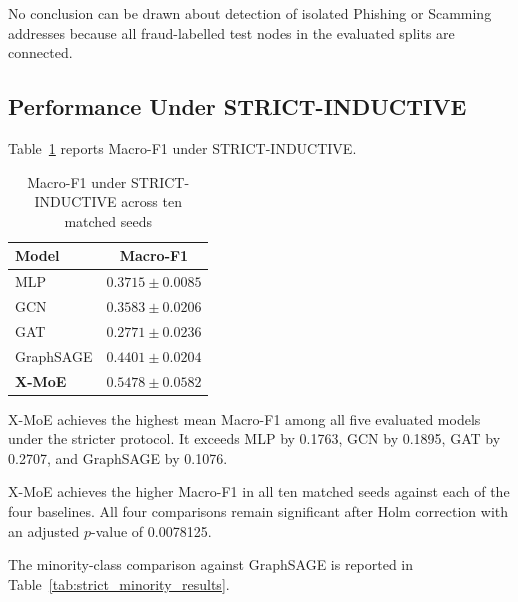 \documentclass{ieeeaccess}
\begin{document}
No conclusion can be drawn about detection of isolated Phishing or Scamming addresses because all fraud-labelled test nodes in the evaluated splits are connected.


\subsection{Performance Under STRICT-INDUCTIVE}

Table~\ref{tab:strict_overall_results} reports Macro-F1 under STRICT-INDUCTIVE.

\begin{table}[t]
\centering
\caption{Macro-F1 under STRICT-INDUCTIVE across ten matched seeds}
\label{tab:strict_overall_results}

\renewcommand{\arraystretch}{1.12}
\setlength{\tabcolsep}{5pt}
\scriptsize

\begin{tabular}{lc}
\toprule
\textbf{Model} &
\textbf{Macro-F1} \\
\midrule

MLP &
$0.3715 \pm 0.0085$ \\

GCN &
$0.3583 \pm 0.0206$ \\

GAT &
$0.2771 \pm 0.0236$ \\

GraphSAGE &
$0.4401 \pm 0.0204$ \\

\textbf{X-MoE} &
$\mathbf{0.5478 \pm 0.0582}$ \\

\bottomrule
\end{tabular}
\end{table}

X-MoE achieves the highest mean Macro-F1 among all five evaluated models under the stricter protocol. It exceeds MLP by 0.1763, GCN by 0.1895, GAT by 0.2707, and GraphSAGE by 0.1076.

X-MoE achieves the higher Macro-F1 in all ten matched seeds against each of the four baselines. All four comparisons remain significant after Holm correction with an adjusted \(p\)-value of 0.0078125.

The minority-class comparison against GraphSAGE is reported in Table~\ref{tab:strict_minority_results}.
\end{document}
